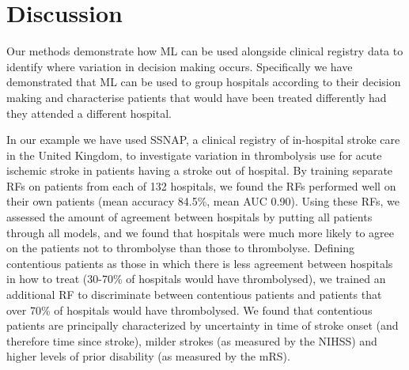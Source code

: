 \documentclass[12pt,a4paper, pdftex]{elsarticle}
\begin{document}
\section{Discussion}

Our methods demonstrate how ML can be used alongside clinical registry data to identify where variation in decision making occurs. Specifically we have demonstrated that ML can be used to group hospitals according to their decision making and characterise patients that would have been treated differently had they attended a different hospital. 

In our example we have used SSNAP, a clinical registry of in-hospital stroke care in the United Kingdom, to investigate variation in thrombolysis use for acute ischemic stroke in patients having a stroke out of hospital. By training separate RFs on patients from each of 132 hospitals, we found the RFs performed well on their own patients (mean accuracy 84.5\%, mean AUC 0.90). Using these RFs, we assessed the amount of agreement between hospitals by putting all patients through all models, and we found that hospitals were much more likely to agree on the patients not to thrombolyse than those to thrombolyse. Defining contentious patients as those in which there is less agreement between hospitals in how to treat (30-70\% of hospitals would have thrombolysed), we trained an additional RF to discriminate between contentious patients and patients that over 70\% of hospitals would have thrombolysed. We found that contentious patients are principally characterized by uncertainty in time of stroke onset (and therefore time since stroke), milder strokes (as measured by the NIHSS) and higher levels of prior disability (as measured by the mRS). 
\end{document}
